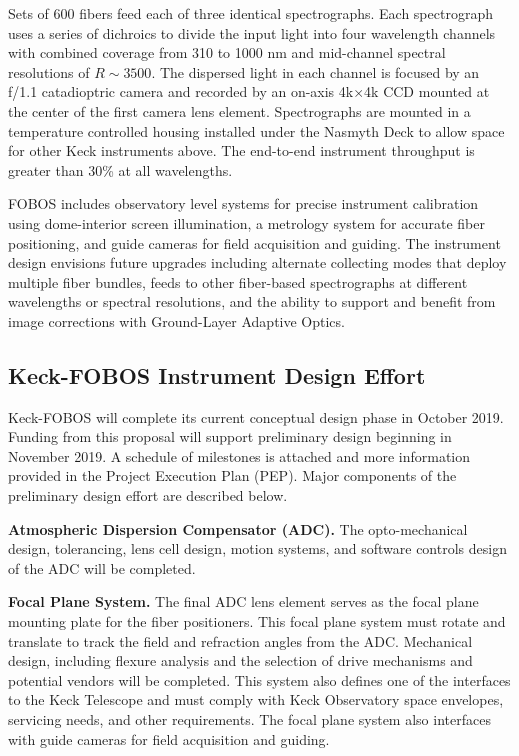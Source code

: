 \documentclass[oneside,11pt]{amsart}
\newcommand{\comment}[2][todo]{{\color{#1}[[{\bf #2}]]}}
\begin{document}
Sets of 600 fibers feed each of three identical spectrographs.  Each spectrograph uses a series of dichroics to divide
the input light into four wavelength channels with combined coverage from 310 to 1000 nm and mid-channel spectral
resolutions of $R \sim 3500$.  The dispersed light in each channel is focused by an f/1.1 catadioptric camera and
recorded by an on-axis 4k$\times$4k CCD mounted at the center of the first camera lens element.  Spectrographs are
mounted in a temperature controlled housing installed under the Nasmyth Deck to allow space for other Keck instruments
above.  The end-to-end instrument throughput is greater than 30\% at all wavelengths.

FOBOS includes observatory level systems for precise instrument calibration using dome-interior screen illumination, a
metrology system for accurate fiber positioning, and guide cameras for field acquisition and guiding.  The instrument
design envisions future upgrades including alternate collecting modes that deploy multiple fiber bundles, feeds to
other fiber-based spectrographs at different wavelengths or spectral resolutions, and the ability to support and
benefit from image corrections with Ground-Layer Adaptive Optics.



\subsection{Keck-FOBOS Instrument Design Effort}
\label{sec:design}

Keck-FOBOS will complete its current conceptual design phase in October 2019.  Funding from this proposal will support preliminary design beginning in November 2019.  A schedule of milestones is attached and more information provided in the Project Execution Plan (PEP).  Major components of the preliminary design effort are described below.

\noindent \textbf{Atmospheric Dispersion Compensator (ADC).} The opto-mechanical design, tolerancing, lens cell design, motion systems, and software controls design of the ADC will be completed.  

\noindent \textbf{Focal Plane System.} The final ADC lens element serves as the focal plane mounting plate for the fiber positioners.  This focal plane system must rotate and translate to track the field and refraction angles from the ADC.  Mechanical design, including flexure analysis and the selection of drive mechanisms and potential vendors will be completed.  This system also defines one of the interfaces to the Keck Telescope and must comply with Keck Observatory space envelopes, servicing needs, and other requirements.  The focal plane system also interfaces with guide cameras for field acquisition and guiding.
\end{document}
